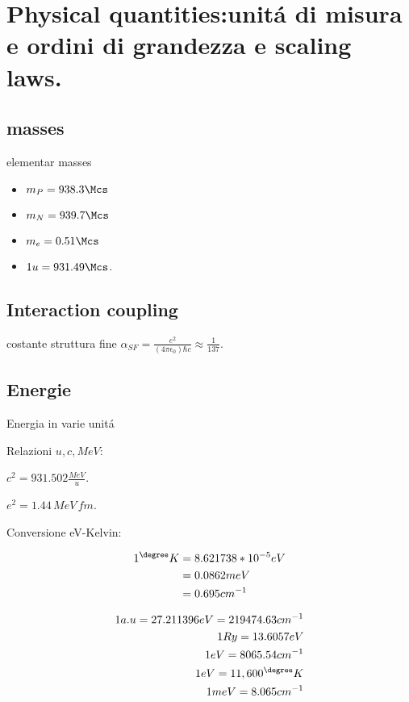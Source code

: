 \section{Physical quantities:unit\'a di misura e ordini di grandezza e scaling laws.}

\subsection{masses}

\begin{frame}{elementar masses}
    \begin{itemize}
\item $m_P=938.3\Mcs$
\item $m_N=939.7\Mcs$
\item $m_e=0.51\Mcs$
\item  $1 u=931.49 \Mcs$.
\end{itemize}
\end{frame}

\subsection{Interaction coupling}

\begin{frame}{costante struttura fine}
    $\alpha_{SF}=\frac{e^2}{(4\pi\epsilon_0)\hbar c}\approx\frac{1}{137}$.
\end{frame}

\subsection{Energie}

\begin{frame}{Energia in varie unit\'a}

Relazioni $u,c,MeV$:
 
$c^2=931.502\frac{MeV}{u}$.
 
$e^2=1.44\,MeV\,fm$.
 
Conversione eV-Kelvin:
 
\begin{align*}
1  ^{\degree}K&= 8.621738*10^{-5}  eV \\
&= 0.0862 meV \\
&= 0.695 cm^{-1}
\end{align*}

\begin{align*}
1 a.u=27.211396 eV=219474.63 cm^{-1}\\
1 Ry=13.6057 eV \\
1 eV =8065.54 cm^{-1} \\
1 eV= 11,600  ^{\degree}K\\
1 meV = 8.065 cm^{-1}
\end{align*}
\end{frame}

